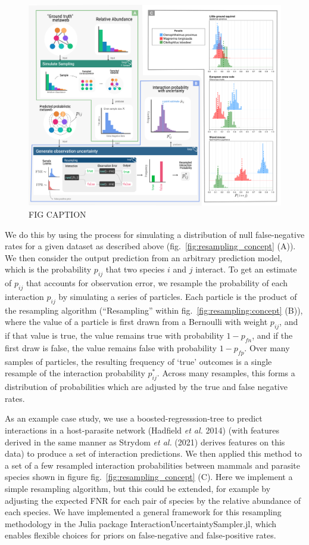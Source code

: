\documentclass[11pt]{article}
\makeatletter
\def\maxwidth{\ifdim\Gin@nat@width>\linewidth\linewidth
\else\Gin@nat@width\fi}
\let\Oldincludegraphics\includegraphics
\renewcommand{\includegraphics}[1]{\Oldincludegraphics[width=\maxwidth]{#1}}
\makeatother
\begin{document}
\begin{figure}
\centering
\includegraphics{./figures/uncertainty_sampler.png}
\caption{FIG CAPTION}
\end{figure}

We do this by using the process for simulating a distribution of null
false-negative rates for a given dataset as described above
(fig.~\ref{fig:resampling_concept} (A)). We then consider the output
prediction from an arbitrary prediction model, which is the probability
\(p_{ij}\) that two species \(i\) and \(j\) interact. To get an estimate
of \(p_{ij}\) that accounts for observation error, we resample the
probability of each interaction \(p_{ij}\) by simulating a series of
particles. Each particle is the product of the resampling algorithm
(``Resampling'' within fig.~\ref{fig:resampling:concept} (B)), where the
value of a particle is first drawn from a Bernoulli with weight
\(p_{ij}\), and if that value is true, the value remains true with
probability \(1-p_{fn}\), and if the first draw is false, the value
remains false with probability \(1-p_{fp}\). Over many samples of
particles, the resulting frequency of `true' outcomes is a single
resample of the interaction probability \(p_{ij}^*\). Across many
resamples, this forms a distribution of probabilities which are adjusted
by the true and false negative rates.

As an example case study, we use a boosted-regresssion-tree to predict
interactions in a host-parasite network (Hadfield \emph{et al.} 2014)
(with features derived in the same manner as Strydom \emph{et al.}
(2021) derives features on this data) to produce a set of interaction
predictions. We then applied this method to a set of a few resampled
interaction probabilities between mammals and parasite species shown in
figure fig.~\ref{fig:resampling_concept} (C). Here we implement a simple
resampling algorithm, but this could be extended, for example by
adjusting the expected FNR for each pair of species by the relative
abundance of each species. We have implemented a general framework for
this resampling methodology in the Julia package
InteractionUncertaintySampler.jl, which enables flexible choices for
priors on false-negative and false-positive rates.
\end{document}
